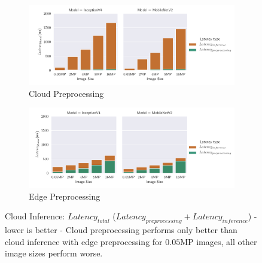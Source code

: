 \begin{figure}[!htb]
\centering
\begin{subfigure}[b]{0.95\textwidth}
   \includegraphics[width=1\linewidth]{./Bilder/single_plots/cloud_inference_plots/Cloud_Preprocessing_Inference_Comb_cloud_prepro.pdf}
   \caption{Cloud Preprocessing}
   \label{fig:CloudInference+PreproCloud} 
\end{subfigure}

\begin{subfigure}[b]{0.95\textwidth}
   \includegraphics[width=1\linewidth]{./Bilder/single_plots/cloud_inference_plots/Cloud_Preprocessing_Inference_Comb_edge_prepro.pdf}
   \caption{Edge Preprocessing}
   \label{fig:CloudInference+PreproEdge}
\end{subfigure}

\caption[Cloud Inference:  $Latency_{total}$  - lower is better]{Cloud Inference:  $Latency_{total}$ ($Latency_{preprocessing}+Latency_{inference}$) - lower is better - 
Cloud preprocessing performs only better than cloud inference with edge preprocessing for $0.05$MP images, all other image sizes perform worse.}
\end{figure}

